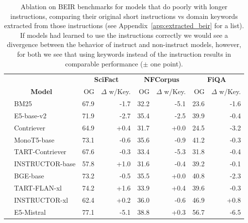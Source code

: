 
\setlength\tabcolsep{5 pt} %
\begin{table}[]
\small	
\centering
\begin{tabular}{ll|rr|rr|rr}
\toprule
 & & \multicolumn{2}{c}{\textbf{SciFact}}  & \multicolumn{2}{c}{\textbf{NFCorpus}}  & \multicolumn{2}{c}{\textbf{FiQA}} \\ 
\multicolumn{2}{c}{\textbf{Model}} & OG & $\Delta$ w/Key. & OG & $\Delta$ w/Key. & OG & $\Delta$ w/Key. \\
\midrule
\parbox[t]{3mm}{} & BM25 & 67.9 & -1.7 & 32.2 & -5.1 & 23.6 & -1.6  \\
& E5-base-v2 & 71.9 & -2.7 & 35.4 & -2.5 & 39.9 & -0.4  \\
& Contriever & 64.9 & +0.4 & 31.7 & +0.0 & 24.5 & -3.2  \\
& MonoT5-base & 73.1 & -0.6  & 35.6 & -0.9 & 41.2 & -0.3  \\
\midrule
\parbox[t]{3mm}{} 
& TART-Contriever & 67.6 & -0.3  & 33.4 & -5.3 & 31.8 & -0.4 \\
& INSTRUCTOR-base & 57.8 & +1.0 & 31.6 & -0.4 & 39.2 & -0.1  \\
& BGE-base & 73.2 & -0.5 & 35.5 & +0.0 & 40.8 & -2.3 \\
& TART-FLAN-xl & 74.2 & +1.6 & 33.9 & +0.4 & 39.6 & -0.3 \\
& INSTRUCTOR-xl & 62.4 & +0.2 & 36.0 & -0.6 & 46.9 & +0.8  \\
& E5-Mistral & 77.1 & -5.1  & 38.8  & +0.3 & 56.7 & -6.5  \\
\bottomrule
\end{tabular}

\caption{Ablation on BEIR benchmarks for models that do poorly with longer instructions, comparing their original short instructions vs domain keywords extracted from those instructions (see Appendix~\ref{app:extracted_beir} for a list). If models had learned to use the instructions correctly we would see a divergence between the behavior of instruct and non-instruct models, however, for both we see that using keywords  instead of the instruction results in comparable performance ($\pm$ one point). 
}
\label{tab:ablation_keywords}
\end{table}